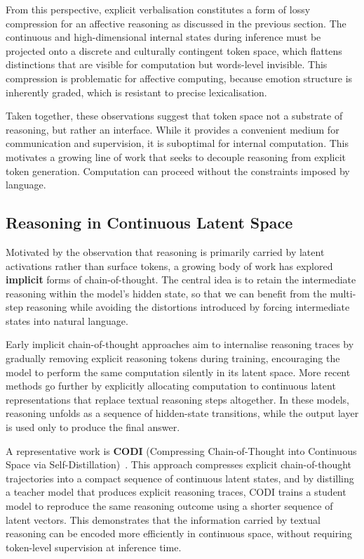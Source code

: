 \documentclass[12pt,twoside]{report}
\begin{document}
From this perspective, explicit verbalisation constitutes a form of lossy compression for an affective reasoning as discussed in the previous section. The continuous and high-dimensional internal states during inference must be projected onto a discrete and culturally contingent token space, which flattens distinctions that are visible for computation but words-level invisible. This compression is problematic for affective computing, because emotion structure is inherently graded, which is resistant to precise lexicalisation.

Taken together, these observations suggest that token space not a substrate of reasoning, but rather an interface. While it provides a convenient medium for communication and supervision, it is suboptimal for internal computation. This motivates a growing line of work that seeks to decouple reasoning from explicit token generation. Computation can proceed without the constraints imposed by language.

\subsection{Reasoning in Continuous Latent Space}

Motivated by the observation that reasoning is primarily carried by latent activations rather than surface tokens, a growing body of work has explored \textbf{implicit} forms of chain-of-thought. The central idea is to retain the intermediate reasoning within the model's hidden state, so that we can benefit from the multi-step reasoning while avoiding the distortions introduced by forcing intermediate states into natural language.

Early implicit chain-of-thought approaches aim to internalise reasoning traces by gradually removing explicit reasoning tokens during training, encouraging the model to perform the same computation silently in its latent space. More recent methods go further by explicitly allocating computation to continuous latent representations that replace textual reasoning steps altogether. In these models, reasoning unfolds as a sequence of hidden-state transitions, while the output layer is used only to produce the final answer.

A representative work is \textbf{CODI} (Compressing Chain-of-Thought into Continuous Space via Self-Distillation)~\cite{shen2025codicompressingchainofthoughtcontinuous}. This approach compresses explicit chain-of-thought trajectories into a compact sequence of continuous latent states, and by distilling a teacher model that produces explicit reasoning traces, CODI trains a student model to reproduce the same reasoning outcome using a shorter sequence of latent vectors. This demonstrates that the information carried by textual reasoning can be encoded more efficiently in continuous space, without requiring token-level supervision at inference time.
\end{document}
